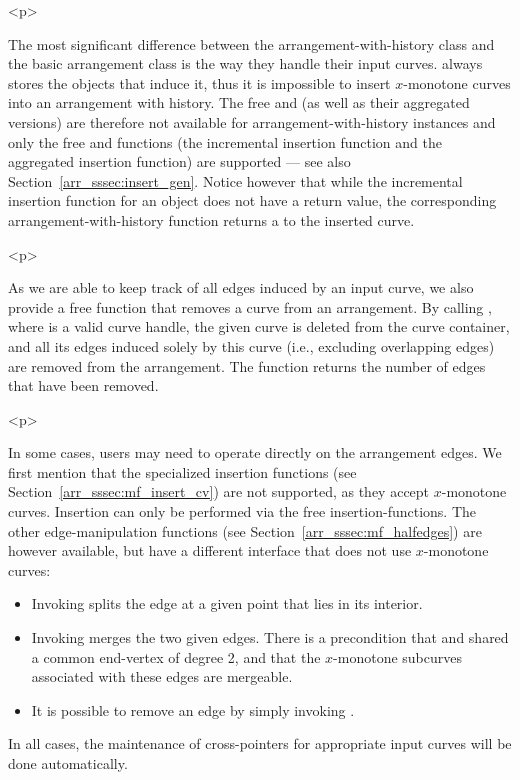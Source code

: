 \begin{ccHtmlOnly}<p>\end{ccHtmlOnly}
The most significant difference between the arrangement-with-history class
and the basic arrangement class is the way they handle their input curves.
 always stores the  objects
that induce it, thus it is impossible to insert $x$-monotone curves into
an arrangement with history. The free 
and  (as well as their aggregated versions)
are therefore not available for arrangement-with-history instances
and only the free  and  functions
(the incremental insertion function and the aggregated insertion function)
are supported --- see also Section~\ref{arr_sssec:insert_gen}. Notice however
that while the incremental insertion function  for
an  object  does not have a return value,
the corresponding arrangement-with-history function returns a
 to the inserted curve.

\begin{ccHtmlOnly}<p>\end{ccHtmlOnly}
As we are able to keep track of all edges induced by an input curve, we also
provide a free function that removes a curve from an arrangement. By calling
, where  is a valid curve handle, the given curve
is deleted from the curve container, and all its edges induced solely by
this curve (i.e., excluding overlapping edges) are removed from the 
arrangement. The function returns the number of edges that have been removed.

\begin{ccHtmlOnly}<p>\end{ccHtmlOnly}
In some cases, users may need to operate directly on the arrangement edges.
We first mention that the specialized insertion functions (see 
Section~\ref{arr_sssec:mf_insert_cv}) are not supported, as they accept
$x$-monotone curves. Insertion can only be performed via the free 
insertion-functions. The other edge-manipulation functions 
(see Section~\ref{arr_sssec:mf_halfedges}) are however available, but have 
a different interface that does not use $x$-monotone curves:
\begin{itemize}
\item Invoking  splits the edge  at a given point
 that lies in its interior.
\item Invoking  merges the two given edges. There is
a precondition that  and  shared a common end-vertex of degree
2, and that the $x$-monotone subcurves associated with these edges are
mergeable.
\item It is possible to remove an edge by simply invoking
.
\end{itemize}
In all cases, the maintenance of cross-pointers for appropriate input
curves will be done automatically.

